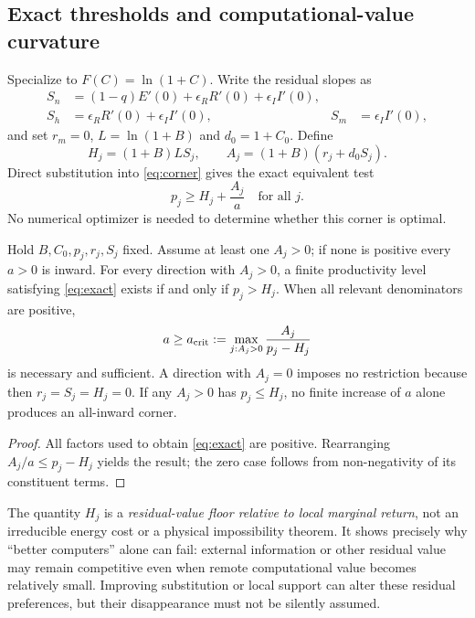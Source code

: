 \subsection{Exact thresholds and computational-value curvature}
\label{sec:threshold}

Specialize to $F(C)=\ln(1+C)$. Write the residual slopes as
\begin{align}
 S_n&=(1-q)E'(0)+\epsilon_RR'(0)+\epsilon_II'(0),\nonumber\\
 S_h&=\epsilon_RR'(0)+\epsilon_II'(0),& S_m&=\epsilon_II'(0),
 \label{eq:slopes}
\end{align}
and set $r_m=0$, $L=\ln(1+B)$ and $d_0=1+C_0$. Define
\begin{equation}
 H_j=(1+B)L S_j,\qquad A_j=(1+B)(r_j+d_0S_j).
 \label{eq:HA}
\end{equation}
Direct substitution into \cref{eq:corner} gives the exact equivalent test
\begin{equation}
 \boxed{p_j\geq H_j+\frac{A_j}{a}\quad\text{for all }j.}
 \label{eq:exact}
\end{equation}
No numerical optimizer is needed to determine whether this corner is optimal.

\begin{proposition}
\label{prop:threshold}
Hold $B,C_0,p_j,r_j,S_j$ fixed. Assume at least one $A_j>0$; if none is positive every $a>0$ is inward. For every direction with $A_j>0$, a finite productivity level satisfying \cref{eq:exact} exists if and only if $p_j>H_j$. When all relevant denominators are positive,
\begin{equation}
 a\geq a_{\rm crit}:=\max_{j:A_j>0}\frac{A_j}{p_j-H_j}
 \label{eq:acrit}
\end{equation}
is necessary and sufficient. A direction with $A_j=0$ imposes no restriction because then $r_j=S_j=H_j=0$. If any $A_j>0$ has $p_j\leq H_j$, no finite increase of $a$ alone produces an all-inward corner.
\end{proposition}
\begin{proof}
All factors used to obtain \cref{eq:exact} are positive. Rearranging $A_j/a\leq p_j-H_j$ yields the result; the zero case follows from non-negativity of its constituent terms.
\end{proof}

The quantity $H_j$ is a \emph{residual-value floor relative to local marginal return}, not an irreducible energy cost or a physical impossibility theorem. It shows precisely why ``better computers'' alone can fail: external information or other residual value may remain competitive even when remote computational value becomes relatively small. Improving substitution or local support can alter these residual preferences, but their disappearance must not be silently assumed.

